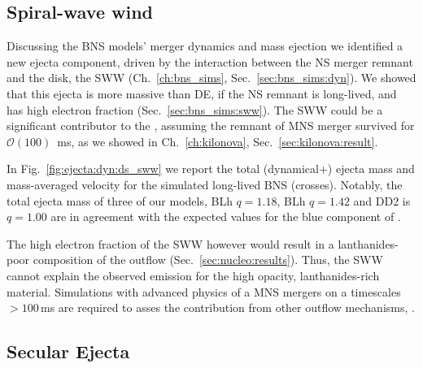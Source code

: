 \subsection{Spiral-wave wind}

Discussing the \ac{BNS} models' merger dynamics and mass ejection we identified 
a new ejecta component, driven by the interaction between the \ac{NS} merger 
remnant and the disk, the \ac{SWW} (Ch.~\ref{ch:bns_sims}, Sec.~\ref{sec:bns_sims:dyn}).
We showed that this ejecta is more massive than \ac{DE}, if the \ac{NS} remnant 
is long-lived, and has high electron fraction (Sec.~\ref{sec:bns_sims:sww}).
%
The \ac{SWW} could be a significant contributor to the \AT{}, assuming the remnant 
of \GW{} \ac{MNS} merger survived for $\mathcal{O}(100)$~ms, as we showed 
in Ch.~\ref{ch:kilonova}, Sec.~\ref{sec:kilonova:result}.


In Fig.~\ref{fig:ejecta:dyn:ds_sww} we report the total (dynamical+\swind{}) ejecta 
mass and mass-averaged velocity for the simulated long-lived \ac{BNS} (crosses).
%
Notably, the total ejecta mass of three of our models, 
BLh $q=1.18$, BLh $q=1.42$ and DD2 is $q=1.00$ are in agreement with the expected 
values for the blue component of \AT{}.

The high electron fraction of the \ac{SWW} %
however would result in a lanthanides-poor composition of the outflow 
(Sec.~\ref{sec:nucleo:results}). Thus, the \ac{SWW} cannot explain the 
observed emission for the high opacity, lanthanides-rich material.
%
Simulations with advanced physics of a \ac{MNS} mergers on a timescales 
${>}100\,$ms are required to asses the contribution from other outflow mechanisms, 
\citep{Lee:2009uc,Fernandez:2015use,Siegel:2017nub,Fujibayashi:2017puw,Fernandez:2018kax,Radice:2018xqa}.



\subsection{Secular Ejecta}

